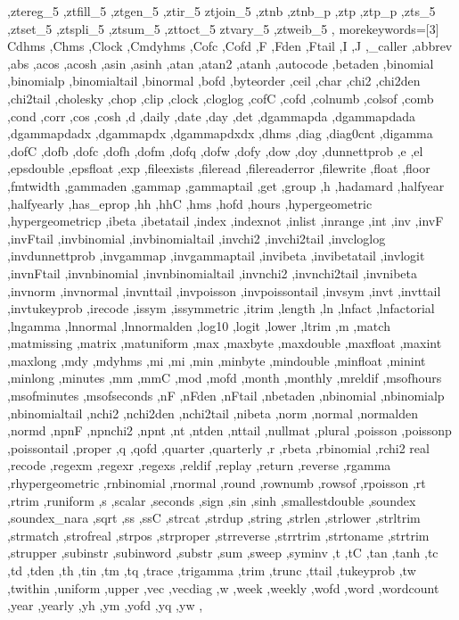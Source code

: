 {{    ,ztereg_5 ,ztfill_5 ,ztgen_5 ,ztir_5 ztjoin_5 ,ztnb ,ztnb_p ,ztp
    ,ztp_p ,zts_5 ,ztset_5 ,ztspli_5 ,ztsum_5 ,zttoct_5 ztvary_5
    ,ztweib_5
  },
  morekeywords=[3]{
    Cdhms ,Chms ,Clock ,Cmdyhms ,Cofc ,Cofd ,F ,Fden ,Ftail ,I ,J
    ,_caller ,abbrev ,abs ,acos ,acosh ,asin ,asinh ,atan ,atan2
    ,atanh ,autocode ,betaden ,binomial ,binomialp ,binomialtail
    ,binormal ,bofd ,byteorder ,ceil ,char ,chi2 ,chi2den ,chi2tail
    ,cholesky ,chop ,clip ,clock ,cloglog ,cofC ,cofd ,colnumb ,colsof
    ,comb ,cond ,corr ,cos ,cosh ,d ,daily ,date ,day ,det ,dgammapda
    ,dgammapdada ,dgammapdadx ,dgammapdx ,dgammapdxdx ,dhms ,diag
    ,diag0cnt ,digamma ,dofC ,dofb ,dofc ,dofh ,dofm ,dofq ,dofw ,dofy
    ,dow ,doy ,dunnettprob ,e ,el ,epsdouble ,epsfloat ,exp ,fileexists
    ,fileread ,filereaderror ,filewrite ,float ,floor ,fmtwidth
    ,gammaden ,gammap ,gammaptail ,get ,group ,h ,hadamard ,halfyear
    ,halfyearly ,has_eprop ,hh ,hhC ,hms ,hofd ,hours ,hypergeometric
    ,hypergeometricp ,ibeta ,ibetatail ,index ,indexnot ,inlist
    ,inrange ,int ,inv ,invF ,invFtail ,invbinomial ,invbinomialtail
    ,invchi2 ,invchi2tail ,invcloglog ,invdunnettprob ,invgammap
    ,invgammaptail ,invibeta ,invibetatail ,invlogit ,invnFtail
    ,invnbinomial ,invnbinomialtail ,invnchi2 ,invnchi2tail ,invnibeta
    ,invnorm ,invnormal ,invnttail ,invpoisson ,invpoissontail ,invsym
    ,invt ,invttail ,invtukeyprob ,irecode ,issym ,issymmetric ,itrim
    ,length ,ln ,lnfact ,lnfactorial ,lngamma ,lnnormal ,lnnormalden
    ,log10 ,logit ,lower ,ltrim ,m ,match ,matmissing ,matrix
    ,matuniform ,max ,maxbyte ,maxdouble ,maxfloat ,maxint ,maxlong ,mdy
    ,mdyhms ,mi ,mi ,min ,minbyte ,mindouble ,minfloat ,minint ,minlong
    ,minutes ,mm ,mmC ,mod ,mofd ,month ,monthly ,mreldif
    ,msofhours ,msofminutes ,msofseconds ,nF ,nFden ,nFtail ,nbetaden
    ,nbinomial ,nbinomialp ,nbinomialtail ,nchi2 ,nchi2den ,nchi2tail
    ,nibeta ,norm ,normal ,normalden ,normd ,npnF ,npnchi2 ,npnt ,nt
    ,ntden ,nttail ,nullmat ,plural ,poisson ,poissonp ,poissontail
    ,proper ,q ,qofd ,quarter ,quarterly ,r ,rbeta ,rbinomial ,rchi2
    real ,recode ,regexm ,regexr ,regexs ,reldif ,replay ,return
    ,reverse ,rgamma ,rhypergeometric ,rnbinomial ,rnormal ,round
    ,rownumb ,rowsof ,rpoisson ,rt ,rtrim ,runiform ,s ,scalar ,seconds
    ,sign ,sin ,sinh ,smallestdouble ,soundex ,soundex_nara ,sqrt ,ss
    ,ssC ,strcat ,strdup ,string ,strlen ,strlower ,strltrim ,strmatch
    ,strofreal ,strpos ,strproper ,strreverse ,strrtrim ,strtoname
    ,strtrim ,strupper ,subinstr ,subinword ,substr ,sum ,sweep ,syminv
    ,t ,tC ,tan ,tanh ,tc ,td ,tden ,th ,tin ,tm ,tq ,trace ,trigamma
    ,trim ,trunc ,ttail ,tukeyprob ,tw ,twithin ,uniform ,upper ,vec
    ,vecdiag ,w ,week ,weekly ,wofd ,word ,wordcount ,year ,yearly
    ,yh ,ym ,yofd ,yq ,yw
  },
}


\providecommand{\textcolordummy}[2]{#2}

